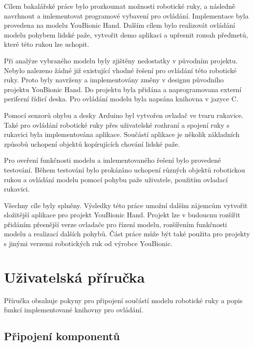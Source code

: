 \documentclass[thesis=B,czech]{FITthesis}[2012/06/26]
\begin{document}
\begin{conclusion}

Cílem bakalářské práce bylo prozkoumat možnosti robotické ruky, a následně navrhnout a imlementovat programové vybavení pro ovládání. Implementace byla provedena na modelu YouBionic Hand. Dalším cílem bylo realizovát ovládání modelu pohybem lidské paže, vytvořit demo aplikaci a upřesnit rozsah předmetů, které této rukou lze uchopit.


Při analýze vybraného modelu  byly zjištěny nedostatky v původním projektu. Nebylo nalezeno žádné již existující vhodné řešení pro ovládání této robotické ruky. Proto byly navrženy a implementovány změny v designu původního projektu YouBionic Hand. Do projektu byla přidána a naprogramovana externí periferní řídicí deska. Pro ovládání modelu byla napsána knihovna v jazyce C.


Pomocí senzorů ohybu a desky Arduino byl vytvořen ovladač ve tvaru rukavice. Také pro ovládání robotické ruky přes uživatelské rozhraní a spojení ruky s rukavici byla implementována aplikace. Součástí aplikace je několik základních způsobů uchopení objektů kopírujících chování lidské paže.


Pro oveření funkčnosti modelu a imlementovaného řešení bylo provedené testování. Během testování bylo prokázáno uchopení různých objektů robotickou rukou a ovládání modelu pomocí pohybu paže uživatele, použitím ovladací rukavici. 


Všechny cíle byly splněny. Výsledky této práce umožní dalším zájemcům vytvořit složitější aplikace pro projekt YouBionic Hand. Projekt lze v budoucnu rozšířit přidáním přesnější verze ovladače pro řízení modelu, rozšířením funkčnosti modelu a realizací dalších pohybů. Část práce může být také použita pro projekty s jinými verzemi robotických ruk od výrobce YouBionic.


\end{conclusion}




\appendix


\chapter{Uživatelská příručka}

Příručka obsahuje pokyny pro připojení součástí modelu robotické ruky a popis funkcí implementované knihovny pro ovládání.

\section{Připojení komponentů}
\end{document}
